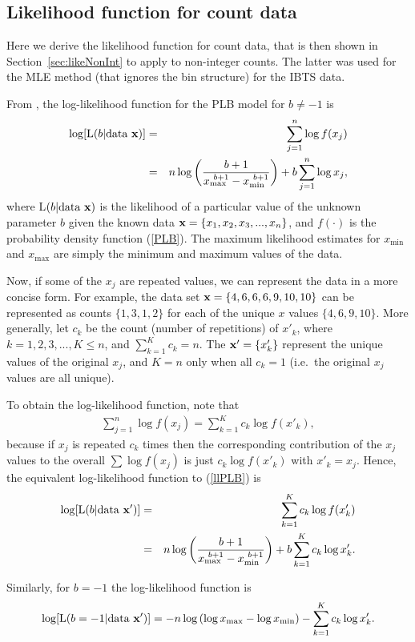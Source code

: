 \documentclass[12pt, letter]{article}
\newcommand{\eb}{\begin{eqnarray}}
\newcommand{\ee}{\end{eqnarray}}
\newcommand{\xmin}{x_{\mathrm{min}}}
\newcommand{\xmax}{x_{\mathrm{max}}}
\newcommand{\MEE}{erpbb17}     %
\begin{document}
\subsection{Likelihood function for count data\label{sec:likeCount}}

Here we derive the likelihood function for count data, that is then shown in
Section~\ref{sec:likeNonInt} to apply to non-integer counts. The latter was used for
the MLE method (that ignores the bin structure) for the IBTS data.

From \citet{\MEE}, the log-likelihood function for the PLB model for $b \neq -1$
is
\eb
\log [ \mbox{L} (b | \mbox{data}~{\bf x})] & = & \sum_{j=1}^n \log
f(x_j)\\ & = & n \log\left( \dfrac{ b + 1}{\xmax^{~b + 1} - \xmin^{~b+1}}
\right) + b \sum_{j=1}^n \log x_j,
\label{llPLB}
\ee
where L$(b | \mbox{data}~{\bf x})$ is the likelihood of a particular value
of the unknown parameter $b$ given the known data ${\bf x} = \{x_1, x_2, x_3,
..., x_n\}$, and $f(\cdot)$ is the probability density function (\ref{PLB}). The
maximum likelihood estimates for $\xmin$ and $\xmax$ are simply the minimum and
maximum values of the data.

Now, if some of the $x_j$ are repeated values, we can represent the data in a
more concise form. For example, the data set ${\bf x} = \{4, 6, 6, 6, 9, 10,
10\}$ can be represented as counts $\{1, 3, 1, 2\}$ for each of the unique $x$
values $\{4, 6, 9, 10\}$. More generally, let $c_k$ be the count (number of
repetitions) of $x'_k$, where $k=1, 2, 3, ..., K \leq n$, and $\sum_{k=1}^K c_k
= n$. The ${\bf x'} = \{x'_k\}$ represent the unique values of the original
$x_j$, and $K=n$ only when all $c_k = 1$ (i.e.~the original $x_j$ values are all
unique).

To obtain the log-likelihood function, note that \eb \sum_{j=1}^n \log f(x_j) =
\sum_{k=1}^K c_k \log f(x'_k),
\label{countsEquiv}
\ee because if $x_j$ is repeated $c_k$ times then the corresponding contribution
of the $x_j$ values to the overall $\sum \log f(x_j)$ is just $c_k \log f(x'_k)$
with $x'_k = x_j$. Hence, the equivalent log-likelihood function to
(\ref{llPLB}) is \eb \log [ \mbox{L} (b | \mbox{data}~{\bf x'})] & = &
\sum_{k=1}^K c_k \log f(x'_k)\\ & = & n \log\left( \dfrac{ b + 1}{\xmax^{~b + 1}
  - \xmin^{~b+1}} \right) + b \sum_{k=1}^K c_k \log x'_k.
\label{llPLBcount}
\ee

Similarly, for $b = -1$ the log-likelihood function is \eb \log [ \mbox{L} (b =
  -1 | \mbox{data}~{\bf x'})] = - n \log \left( \log \xmax - \log \xmin \right)
- \sum_{k=1}^K c_k \log x'_k.
\label{llPLB2count}
\ee
\end{document}
